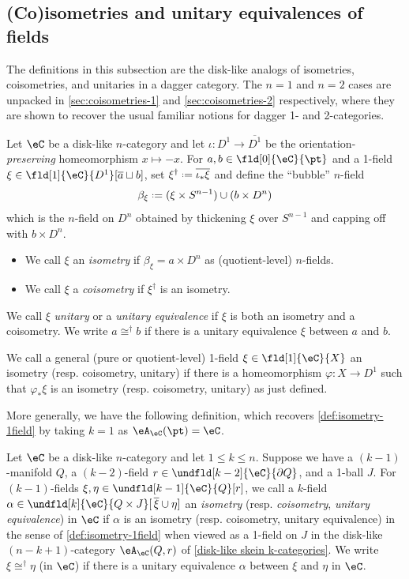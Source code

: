 \documentclass[12pt,reqno]{amsart}
\newcounter{alpha}\renewcommand\thealpha{\upshape\Alph{alpha}}
\newcommand{\A}{\eA}
\newcommand{\C}{\eC}
\newcommand{\fcj}[1]{\overline{#1}}
\newcommand{\orev}{\overline}
\newcommand{\defn}[1]{\emph{#1}}
\renewcommand{\amalg}{\sqcup}
\renewcommand{\star}{\dag}
\DeclareRobustCommand{\coloneq}{\mathrel{\vcenter{\baselineskip0.5ex\lineskiplimit0pt\hbox{\scriptsize{\upshape.}}\hbox{\scriptsize{\upshape.}}}}=}
\begin{document}
\subsection{(Co)isometries and unitary equivalences of fields}
\label{sec:coisometries-general-n}

The definitions in this subsection are the disk-like analogs of isometries, coisometries, and unitaries in a dagger category. The $n=1$ and $n=2$ cases are unpacked in \cref{sec:coisometries-1} and \cref{sec:coisometries-2} respectively, where they are shown to recover the usual familiar notions for dagger 1- and 2-categories.

\begin{definition}\label{def:isometry-1field}
Let $\C$ be a disk-like $n$-category and let $\iota\colon D^1\to\orev{D^1}$ be the orientation-\emph{preserving} homeomorphism $x\mapsto-x$. For $a,b\in\fld[0]{\C}{\pt}$ and a 1-field $\xi\in\fld[1]{\C}{D^1}[\fcj{a}\amalg b]$, set $\xi^\star\coloneq\fcj{\iota_*\xi}$ and define the ``bubble'' $n$-field
\[
  \beta_\xi\coloneq(\xi\times S^{n-1})\cup(b\times D^n)
\]
which is the $n$-field on $D^n$ obtained by thickening $\xi$ over $S^{n-1}$ and capping off with $b\times D^n$.
\begin{itemize}
  \item We call $\xi$ an \defn{isometry} if $\beta_\xi=a\times D^n$ as (quotient-level) $n$-fields.
  \item We call $\xi$ a \defn{coisometry} if $\xi^\star$ is an isometry.
\end{itemize}
We call $\xi$ \defn{unitary} or a \defn{unitary equivalence} if $\xi$ is both an isometry and a coisometry. We write $a\cong^\star b$ if there is a unitary equivalence $\xi$ between $a$ and $b$.

We call a general (pure or quotient-level) 1-field $\xi\in\fld[1]{\C}{X}$ an isometry (resp. coisometry, unitary) if there is a homeomorphism $\varphi\colon X\to D^1$ such that $\varphi_*\xi$ is an isometry (resp. coisometry, unitary) as just defined.
\end{definition}

More generally, we have the following definition, which recovers \cref{def:isometry-1field} by taking $k=1$ as $\A_\C(\pt)=\C$.

\begin{definition}\label{def:isometry-general}
Let $\C$ be a disk-like $n$-category and let $1\leq k\leq n$. Suppose we have a $(k-1)$-manifold $Q$, a $(k-2)$-field $r\in\undfld[k-2]{\C}{\partial Q}$, and a 1-ball $J$. For $(k-1)$-fields $\xi,\eta\in\undfld[k-1]{\C}{Q}[r]$, we call a $k$-field $\alpha\in\undfld[k]{\C}{Q\times J}[\,\fcj{\xi}\cup\eta]$ an \defn{isometry} (resp. \defn{coisometry}, \defn{unitary equivalence}) in $\C$ if $\alpha$ is an isometry (resp. coisometry, unitary equivalence) in the sense of \cref{def:isometry-1field} when viewed as a 1-field on $J$ in the disk-like $(n-k+1)$-category $\A_\C(Q,r)$ of \cref{disk-like skein k-categories}. We write $\xi\cong^\star\eta$ (in $\C$) if there is a unitary equivalence $\alpha$ between $\xi$ and $\eta$ in $\C$.
\end{definition}
\end{document}
